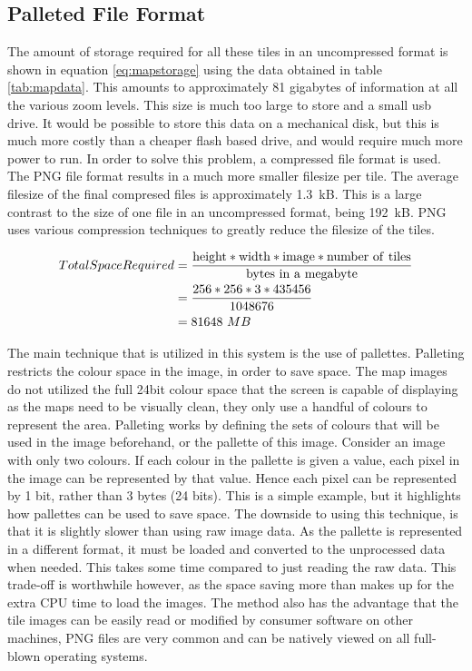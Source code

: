 \subsection{Palleted File Format}

The amount of storage required for all these tiles in an uncompressed format is shown in equation \ref{eq:mapstorage} using the data obtained in table \ref{tab:mapdata}. This amounts to approximately 81 gigabytes of information at all the various zoom levels. This size is much too large to store and a small usb drive. It would be possible to store this data on a mechanical disk, but this is much more costly than a cheaper flash based drive, and would require much more power to run.
In order to solve this problem, a compressed file format is used. The PNG file format results in a much more smaller filesize per tile. The average filesize of the final compresed files is approximately 1.3~kB. This is a large contrast to the size of one file in an uncompressed format, being 192~kB. PNG uses various compression techniques to greatly reduce the filesize of the tiles.

\begin{align}
\label{eq:mapstorage}
Total Space Required &=\frac {\mathrm{height} * \mathrm{width} *\mathrm{image}* {\mathrm{number\ of\ tiles}}} {{ \mathrm{bytes\ in\ a\ megabyte}}} \\
&= \frac{256*256*3*435456}{1048676} \notag \\
&= 81648~MB \notag
\end{align}

The main technique that is utilized in this system is the use of pallettes. Palleting restricts the colour space in the image, in order to save space. The map images do not utilized the full 24bit colour space that the screen is capable of displaying as the maps need to be visually clean, they only use a handful of colours to represent the area. Palleting works by defining the sets of colours that will be used in the image beforehand, or the pallette of this image. Consider an image with only two colours. If each colour in the pallette is given a value, each pixel in the image can be represented by that value. Hence each pixel can be represented by 1 bit, rather than 3 bytes (24 bits). This is a simple example, but it highlights how pallettes can be used to save space.
The downside to using this technique, is that it is slightly slower than using raw image data. As the pallette is represented in a different format, it must be loaded and converted to the unprocessed data when needed. This takes some time compared to just reading the raw data. This trade-off is worthwhile however, as the space saving more than makes up for the extra CPU time to load the images. The method also has the advantage that the tile images can be easily read or modified by consumer software on other machines, PNG files are very common and can be natively viewed on all full-blown operating systems.


